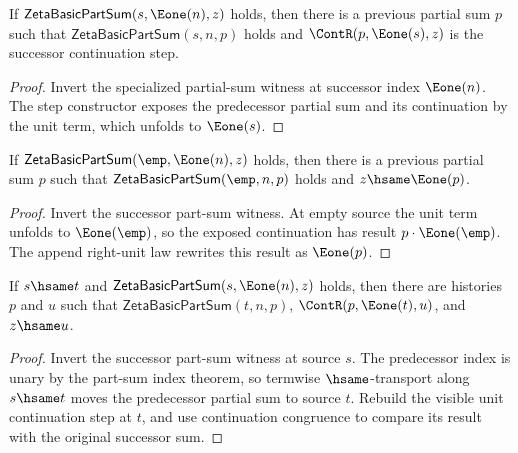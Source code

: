 \begin{theorem}
\label{thm:zeta-basic-part-sum-successor-step-inversion}
If \(\mathsf{ZetaBasicPartSum}(s,\Eone(n),z)\) holds, then there is a
previous partial sum \(p\) such that \(\mathsf{ZetaBasicPartSum}(s,n,p)\)
holds and \(\ContR(p,\Eone(s),z)\) is the successor continuation step.
\end{theorem}
\begin{proof}
Invert the specialized partial-sum witness at successor index \(\Eone(n)\).
The step constructor exposes the predecessor partial sum and its continuation
by the unit term, which unfolds to \(\Eone(s)\).
\end{proof}

\begin{theorem}
\label{thm:zeta-basic-part-sum-empty-source-successor-result-shape}
If $\mathsf{ZetaBasicPartSum}(\emp,\Eone(n),z)$ holds, then there is a
previous partial sum $p$ such that
$\mathsf{ZetaBasicPartSum}(\emp,n,p)$ holds and $z\hsame\Eone(p)$.
\end{theorem}
\begin{proof}
Invert the successor part-sum witness. At empty source the unit term unfolds to
$\Eone(\emp)$, so the exposed continuation has result
$p\cdot\Eone(\emp)$. The append right-unit law rewrites this result as
$\Eone(p)$.
\end{proof}

\begin{theorem}
\label{thm:zeta-basic-part-sum-successor-source-transport-step}
If \(s\hsame t\) and \(\mathsf{ZetaBasicPartSum}(s,\Eone(n),z)\) holds,
then there are histories \(p\) and \(u\) such that
\(\mathsf{ZetaBasicPartSum}(t,n,p)\), \(\ContR(p,\Eone(t),u)\), and
\(z\hsame u\).
\end{theorem}
\begin{proof}
Invert the successor part-sum witness at source \(s\). The predecessor index
is unary by the part-sum index theorem, so termwise \(\hsame\)-transport along
\(s\hsame t\) moves the predecessor partial sum to source \(t\). Rebuild the
visible unit continuation step at \(t\), and use continuation congruence to
compare its result with the original successor sum.
\end{proof}

